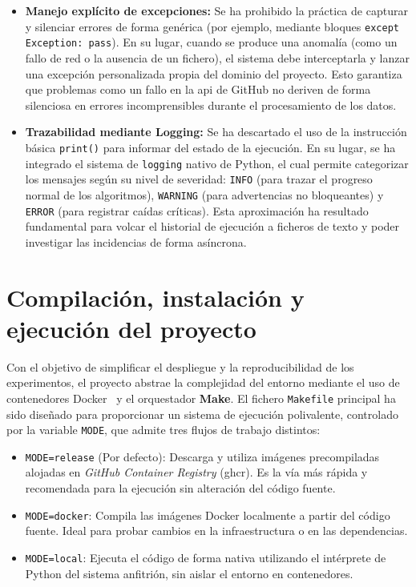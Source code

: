 \begin{itemize}
    \item \textbf{Manejo explícito de excepciones:} Se ha prohibido la práctica de capturar y silenciar errores de forma genérica (por ejemplo, mediante bloques \texttt{except Exception: pass}). En su lugar, cuando se produce una anomalía (como un fallo de red o la ausencia de un fichero), el sistema debe interceptarla y lanzar una excepción personalizada propia del dominio del proyecto. Esto garantiza que problemas como un fallo en la \acrshort{api} de GitHub no deriven de forma silenciosa en errores incomprensibles durante el procesamiento de los datos.
    \item \textbf{Trazabilidad mediante Logging:} Se ha descartado el uso de la instrucción básica \texttt{print()} para informar del estado de la ejecución. En su lugar, se ha integrado el sistema de \texttt{logging} nativo de Python, el cual permite categorizar los mensajes según su nivel de severidad: \texttt{INFO} (para trazar el progreso normal de los algoritmos), \texttt{WARNING} (para advertencias no bloqueantes) y \texttt{ERROR} (para registrar caídas críticas). Esta aproximación ha resultado fundamental para volcar el historial de ejecución a ficheros de texto y poder investigar las incidencias de forma asíncrona.
\end{itemize}

\section{Compilación, instalación y ejecución del proyecto}
Con el objetivo de simplificar el despliegue y la reproducibilidad de los
experimentos, el proyecto abstrae la complejidad del entorno mediante el uso de
contenedores Docker~\cite{DockerManuals} y el orquestador \textbf{Make}. El
fichero \texttt{Makefile} principal ha sido diseñado para proporcionar un
sistema de ejecución polivalente, controlado por la variable \texttt{MODE}, que
admite tres flujos de trabajo distintos:

\begin{itemize}
    \item \texttt{MODE=release} (Por defecto): Descarga y utiliza imágenes precompiladas alojadas en \textit{GitHub Container Registry} (\acrshort{ghcr}). Es la vía más rápida y recomendada para la ejecución sin alteración del código fuente.
    \item \texttt{MODE=docker}: Compila las imágenes Docker localmente a partir del código fuente. Ideal para probar cambios en la infraestructura o en las dependencias.
    \item \texttt{MODE=local}: Ejecuta el código de forma nativa utilizando el intérprete de Python del sistema anfitrión, sin aislar el entorno en contenedores.
\end{itemize}

